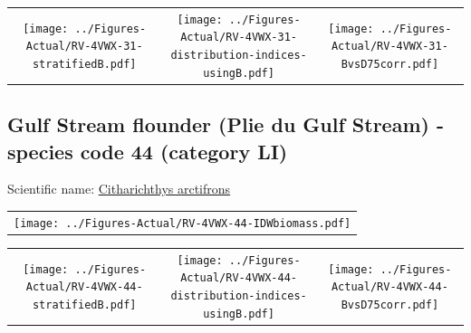 \documentclass[12pt]{article}\usepackage[]{graphicx}\usepackage[]{color}
\begin{document}
\vspace{1cm}
\begin{minipage}{1.0\textwidth}
 \begin{tabular}{ccc}
\texttt{[image: ../Figures-Actual/RV-4VWX-31-stratifiedB.pdf]} & 
\texttt{[image: ../Figures-Actual/RV-4VWX-31-distribution-indices-usingB.pdf]} & 
\texttt{[image: ../Figures-Actual/RV-4VWX-31-BvsD75corr.pdf]} \\ 
\end{tabular} 
\end{minipage}
\clearpage

\renewcommand\thefigure{\thesubsection\Alph{figure}}

\setcounter{figure}{0}

\hypertarget{sec:44}{%
\subsection{Gulf Stream flounder (Plie du Gulf Stream) - species code 44 (category LI)}\label{sec:44}}

  


Scientific name: \href{http://www.marinespecies.org/aphia.php?p=taxdetails\&id=158791}{Citharichthys arctifrons} \newline
\begin{minipage}{1.0\textwidth}
 \begin{tabular}{c}
\texttt{[image: ../Figures-Actual/RV-4VWX-44-IDWbiomass.pdf]} \\ 
\end{tabular} 
\end{minipage}
\newline

\vspace{1cm}
\begin{minipage}{1.0\textwidth}
 \begin{tabular}{ccc}
\texttt{[image: ../Figures-Actual/RV-4VWX-44-stratifiedB.pdf]} & 
\texttt{[image: ../Figures-Actual/RV-4VWX-44-distribution-indices-usingB.pdf]} & 
\texttt{[image: ../Figures-Actual/RV-4VWX-44-BvsD75corr.pdf]} \\ 
\end{tabular} 
\end{minipage}
\clearpage
\end{document}
